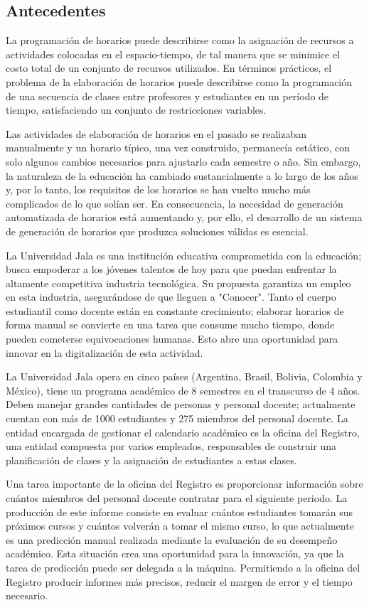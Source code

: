 \subsection{Antecedentes}
La programación de horarios puede describirse como la asignación de recursos a actividades colocadas en el espacio-tiempo, de tal manera que se minimice el costo total de un conjunto de recursos utilizados.
En términos prácticos, el problema de la elaboración de horarios puede describirse como la programación de una secuencia de clases entre profesores y estudiantes en un período de tiempo, satisfaciendo un conjunto de restricciones variables.

Las actividades de elaboración de horarios en el pasado se realizaban manualmente y un horario típico, una vez construido, permanecía estático, con solo algunos cambios necesarios para ajustarlo cada semestre o año.
Sin embargo, la naturaleza de la educación ha cambiado sustancialmente a lo largo de los años y, por lo tanto, los requisitos de los horarios se han vuelto mucho más complicados de lo que solían ser. 
En consecuencia, la necesidad de generación automatizada de horarios está aumentando y, por ello, el desarrollo de un sistema de generación de horarios que produzca soluciones válidas es esencial.

La Universidad Jala es una institución educativa comprometida con la educación; busca empoderar a los jóvenes talentos de hoy para que puedan enfrentar la altamente competitiva industria tecnológica. 
Su propuesta garantiza un empleo en esta industria, asegurándose de que lleguen a "Conocer".
Tanto el cuerpo estudiantil como docente están en constante crecimiento; elaborar horarios de forma manual se convierte en una tarea que consume mucho tiempo, donde pueden cometerse equivocaciones humanas. Esto abre una oportunidad para innovar en la digitalización de esta actividad.

La Universidad Jala opera en cinco países (Argentina, Brasil, Bolivia, Colombia y México), tiene un programa académico de 8 semestres en el transcurso de 4 años.
Deben manejar grandes cantidades de personas y personal docente; actualmente cuentan con más de 1000 estudiantes y 275 miembros del personal docente. La entidad encargada de gestionar el calendario académico es la oficina del Registro, una entidad compuesta por varios empleados, responsables de construir una planificación de clases y la asignación de estudiantes a estas clases.

Una tarea importante de la oficina del Registro es proporcionar información sobre cuántos miembros del personal docente contratar para el siguiente periodo.
La producción de este informe consiste en evaluar cuántos estudiantes tomarán sus próximos cursos y cuántos volverán a tomar el mismo curso, lo que actualmente es una predicción manual realizada mediante la evaluación de su desempeño académico. Esta situación crea una oportunidad para la innovación, ya que la tarea de predicción puede ser delegada a la máquina. Permitiendo a la oficina del Registro producir informes más precisos, reducir el margen de error y el tiempo necesario.

